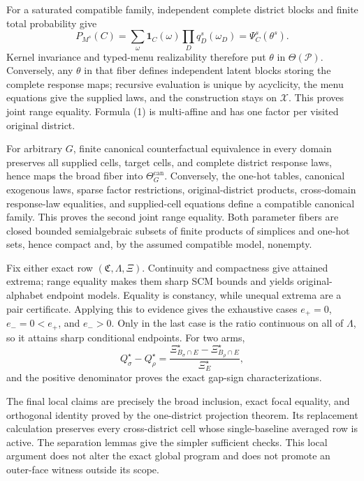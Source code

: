 For a saturated compatible family, independent complete district blocks and finite total probability give
\[
P_{M^s}(C)=\sum_{\omega}\mathbf1_C(\omega)\prod_Dq_D^s(\omega_D)=\Psi_C^s(\theta^s).
\tag{1}
\]
Kernel invariance and typed-menu realizability therefore put \(\theta\) in \(\Theta(\mathcal P)\).  Conversely, any \(\theta\) in that fiber defines independent latent blocks storing the complete response maps; recursive evaluation is unique by acyclicity, the menu equations give the supplied laws, and the construction stays on \(\mathcal X\).  This proves joint range equality.  Formula (1) is multi-affine and has one factor per visited original district.

For arbitrary \(G\), finite canonical counterfactual equivalence in every domain preserves all supplied cells, target cells, and complete district response laws, hence maps the broad fiber into \(\Theta_G^{\mathrm{can}}\).  Conversely, the one-hot tables, canonical exogenous laws, sparse factor restrictions, original-district products, cross-domain response-law equalities, and supplied-cell equations define a compatible canonical family.  This proves the second joint range equality.  Both parameter fibers are closed bounded semialgebraic subsets of finite products of simplices and one-hot sets, hence compact and, by the assumed compatible model, nonempty.

Fix either exact row \((\mathfrak C,\Lambda,\Xi)\).  Continuity and compactness give attained extrema; range equality makes them sharp SCM bounds and yields original-alphabet endpoint models.  Equality is constancy, while unequal extrema are a pair certificate.  Applying this to evidence gives the exhaustive cases \(e_+=0\), \(e_-=0<e_+\), and \(e_->0\).  Only in the last case is the ratio continuous on all of \(\Lambda\), so it attains sharp conditional endpoints.  For two arms,
\[
Q_\sigma^\star-Q_\rho^\star=
\frac{\Xi_{B_\sigma\cap E}^\star-\Xi_{B_\rho\cap E}^\star}{\Xi_E^\star},
\]
and the positive denominator proves the exact gap-sign characterizations.

The final local claims are precisely the broad inclusion, exact focal equality, and orthogonal identity proved by the one-district projection theorem.  Its replacement calculation preserves every cross-district cell whose single-baseline averaged row is active.  The separation lemmas give the simpler sufficient checks.  This local argument does not alter the exact global program and does not promote an outer-face witness outside its scope.